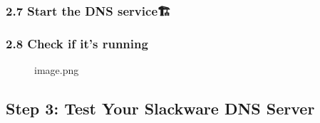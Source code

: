 \subsubsection{2.7 Start the DNS service🏗️}\label{start-the-dns-service}

\begin{Shaded}
\begin{Highlighting}[]
\end{Highlighting}
\end{Shaded}

\subsubsection{2.8 Check if it's running}\label{check-if-its-running}

\begin{Shaded}
\begin{Highlighting}[]

\KeywordTok{|} 
  \KeywordTok{|} 
\end{Highlighting}
\end{Shaded}

\begin{figure}
\centering
{}
\caption{image.png}
\end{figure}

\subsection{Step 3: Test Your Slackware DNS
Server}\label{step-3-test-your-slackware-dns-server}

